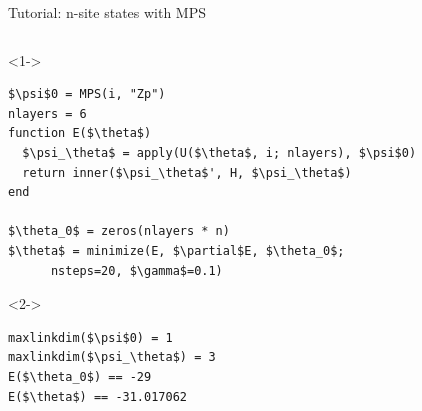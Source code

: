 \begin{frame}[fragile]{Tutorial: n-site states with MPS}

\begin{columns}

\begin{column}{5.5cm}

\begin{onlyenv}<1->
\begin{lstlisting}[language=JuliaLocal, style=julia, mathescape, basicstyle=\scriptsize\ttfamily]
$\psi$0 = MPS(i, "Zp")
nlayers = 6
function E($\theta$)
  $\psi_\theta$ = apply(U($\theta$, i; nlayers), $\psi$0)
  return inner($\psi_\theta$', H, $\psi_\theta$)
end

$\theta_0$ = zeros(nlayers * n)
$\theta$ = minimize(E, $\partial$E, $\theta_0$;
      nsteps=20, $\gamma$=0.1)
\end{lstlisting}
\end{onlyenv}

\begin{onlyenv}<2->
\begin{lstlisting}[language=JuliaLocal, style=julia, mathescape, basicstyle=\scriptsize\ttfamily]
maxlinkdim($\psi$0) = 1
maxlinkdim($\psi_\theta$) = 3
E($\theta_0$) == -29
E($\theta$) == -31.017062
\end{lstlisting}
\end{onlyenv}

\end{column}

\begin{column}{4.5cm}



\end{column}
\end{columns}
\end{frame}
